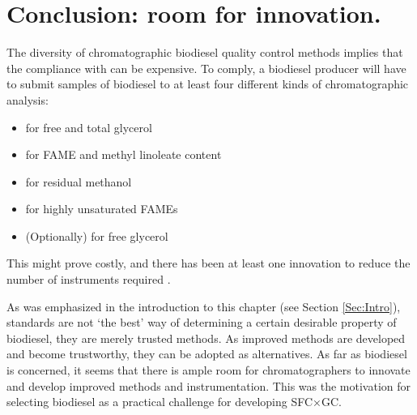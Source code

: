 \section{Conclusion: room for innovation.}

The diversity of chromatographic biodiesel quality control methods implies that
the compliance with  can be expensive. To comply, a biodiesel
producer will have to submit samples of biodiesel to at least four different
kinds of chromatographic analysis:

\begin{itemize}
  \item {} for free and total glycerol
  \item {} for FAME and methyl linoleate content
  \item {} for residual methanol 
  \item {} for highly unsaturated FAMEs
  \item (Optionally)  for free glycerol
\end{itemize}

This might prove costly, and there has been at least one innovation to reduce
the number of instruments required \autocite{McCurry2009}.

As was emphasized in the introduction to this chapter (see Section
\ref{Sec:Intro}), standards are not `the best' way of determining a certain
desirable property of biodiesel, they are merely trusted methods. As improved
methods are developed and become trustworthy, they can be adopted as
alternatives. As far as biodiesel is concerned, it seems that there is ample
room for chromatographers to innovate and develop improved methods and
instrumentation. This was the motivation for selecting biodiesel as a practical
challenge for developing SFC×GC.